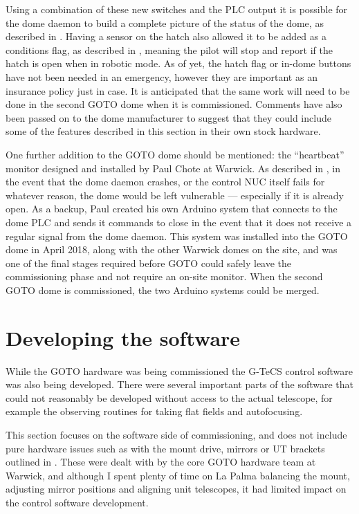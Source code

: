 \begin{colsection}
Using a combination of these new switches and the PLC output it is possible for the dome daemon to build a complete picture of the status of the dome, as described in . Having a sensor on the hatch also allowed it to be added as a conditions flag, as described in , meaning the pilot will stop and report if the hatch is open when in robotic mode. As of yet, the hatch flag or in-dome buttons have not been needed in an emergency, however they are important as an insurance policy just in case. It is anticipated that the same work will need to be done in the second GOTO dome when it is commissioned. Comments have also been passed on to the dome manufacturer to suggest that they could include some of the features described in this section in their own stock hardware.

One further addition to the GOTO dome should be mentioned: the ``heartbeat'' monitor designed and installed by Paul Chote at Warwick. As described in , in the event that the dome daemon crashes, or the control NUC itself fails for whatever reason, the dome would be left vulnerable --- especially if it is already open. As a backup, Paul created his own Arduino system that connects to the dome PLC and sends it commands to close in the event that it does not receive a regular signal from the dome daemon. This system was installed into the GOTO dome in April 2018, along with the other Warwick domes on the site, and was one of the final stages required before GOTO could safely leave the commissioning phase and not require an on-site monitor. When the second GOTO dome is commissioned, the two Arduino systems could be merged.

\end{colsection}


\section{Developing the software}
\label{sec:software_commissioning}


\begin{colsection}

While the GOTO hardware was being commissioned the G-TeCS control software was also being developed. There were several important parts of the software that could not reasonably be developed without access to the actual telescope, for example the observing routines for taking flat fields and autofocusing.

This section focuses on the software side of commissioning, and does not include pure hardware issues such as with the mount drive, mirrors or UT brackets outlined in . These were dealt with by the core GOTO hardware team at Warwick, and although I spent plenty of time on La Palma balancing the mount, adjusting mirror positions and aligning unit telescopes, it had limited impact on the control software development.

\end{colsection}

